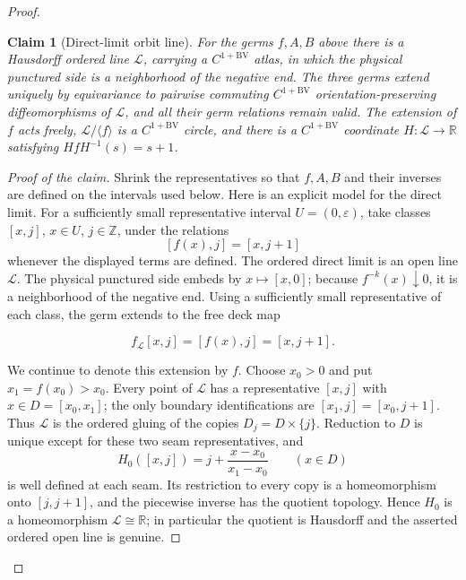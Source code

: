 \documentclass[11pt]{article}
\newtheorem{claim}[theorem]{Claim}
\theoremstyle{definition}
\theoremstyle{remark}
\begin{document}
\begin{proof}
\begin{claim}[Direct-limit orbit line]\label{clm:direct-limit-orbit-line}
For the germs \(f,A,B\) above there is a Hausdorff ordered line
\(\mathscr L\), carrying a \(C^{1+\mathrm{BV}}\) atlas, in which the physical
punctured side is a neighborhood of the negative end.  The three germs
extend uniquely by equivariance to pairwise commuting
\(C^{1+\mathrm{BV}}\) orientation-preserving diffeomorphisms of
\(\mathscr L\), and all their germ relations remain valid.  The extension
of \(f\) acts freely, \(\mathscr L/\langle f\rangle\) is a
\(C^{1+\mathrm{BV}}\) circle, and there is a
\(C^{1+\mathrm{BV}}\) coordinate \(H:\mathscr L\to\mathbb R\) satisfying
\(HfH^{-1}(s)=s+1\).
\end{claim}

\begin{proof}[Proof of the claim]
Shrink the representatives so that $f,A,B$ and their inverses are defined on
the intervals used below.  Here is an explicit model for the direct limit.
For a sufficiently small representative interval \(U=(0,\varepsilon)\),
take classes \([x,j]\), \(x\in U\), \(j\in\mathbb Z\), under the relations
\begin{equation}\label{eq:direct-limit-relation}
 [f(x),j]=[x,j+1]
\end{equation}
whenever the displayed terms are defined.  The ordered direct limit is an
open line \(\mathscr L\).  The physical punctured side embeds by
\(x\mapsto[x,0]\); because \(f^{-k}(x)\downarrow0\), it is a neighborhood of
the negative end.  Using a sufficiently small representative of each class,
the germ extends to the free deck map

\[
 f_{\mathscr L}[x,j]=[f(x),j]=[x,j+1].
\]

We continue to denote this extension by \(f\).  Choose \(x_0>0\) and put
\(x_1=f(x_0)>x_0\).  Every point of \(\mathscr L\) has a representative
\([x,j]\) with \(x\in D=[x_0,x_1]\); the only boundary identifications are
\([x_1,j]=[x_0,j+1]\).  Thus \(\mathscr L\) is the ordered gluing of the
copies \(D_j=D\times\{j\}\).  Reduction to \(D\) is unique except for these
two seam representatives, and
\[
 H_0([x,j])=j+\frac{x-x_0}{x_1-x_0}\qquad(x\in D)
\]
is well defined at each seam.  Its restriction to every copy is a
homeomorphism onto \([j,j+1]\), and the piecewise inverse has the quotient
topology.  Hence \(H_0\) is a homeomorphism
\(\mathscr L\cong\mathbb R\); in particular the quotient is Hausdorff and
the asserted ordered open line is genuine.


\end{proof}
\end{proof}
\end{document}
